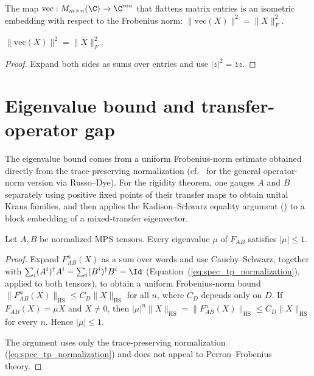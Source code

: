 \begin{definition}\label{def:mat_to_es}
    \leanok
    The map $\mathrm{vec} : M_{m \times n}(\C) \to \C^{mn}$ that
    flattens matrix entries is an isometric embedding with respect
    to the Frobenius norm: $\|\mathrm{vec}(X)\|^2 = \|X\|_F^2$.
\end{definition}

\begin{lemma}\label{lem:norm_mat_to_es}
    \leanok
    $\|\mathrm{vec}(X)\|^2 = \|X\|_F^2$.
\end{lemma}

\begin{proof}\leanok
    Expand both sides as sums over entries and use $|z|^2 = \bar{z}z$.
\end{proof}

\section{Eigenvalue bound and transfer-operator gap}

The eigenvalue bound comes from a uniform Frobenius-norm estimate
obtained directly from the trace-preserving normalization
(cf.~\cite[Proposition~6.1]{Wolf2012Quantum} for the general
operator-norm version via Russo--Dye).
For the rigidity theorem, one gauges $A$ and $B$ separately using
positive fixed points of their transfer maps to obtain unital Kraus
families, and then applies the Kadison--Schwarz equality argument
(\cite[Theorem~5.3]{Wolf2012Quantum}) to
a block embedding of a mixed-transfer eigenvector.

\begin{theorem}\label{thm:eigenvalue_bound}
    \leanok
    Let $A, B$ be normalized MPS tensors.
    Every eigenvalue $\mu$ of $F_{AB}$ satisfies $|\mu| \le 1$.
\end{theorem}

\begin{proof}
    \leanok
    Expand $F_{AB}^n(X)$ as a sum over words and use Cauchy--Schwarz,
    together with
    $\sum_i (A^i)^\dagger A^i = \sum_i (B^i)^\dagger B^i = \Id$
    (Equation~(\ref{eq:spec_tp_normalization}), applied to both tensors),
    to obtain a uniform Frobenius-norm bound
    $\|F_{AB}^n(X)\|_{\mathrm{HS}} \le C_D \|X\|_{\mathrm{HS}}$
    for all $n$, where $C_D$ depends only on $D$.
    If $F_{AB}(X) = \mu X$ and $X \neq 0$, then
    $|\mu|^n \|X\|_{\mathrm{HS}}
        = \|F_{AB}^n(X)\|_{\mathrm{HS}}
        \le C_D \|X\|_{\mathrm{HS}}$
    for every $n$.
    Hence $|\mu| \le 1$.

    The argument uses only the trace-preserving normalization
    (\ref{eq:spec_tp_normalization})
    and does not appeal to Perron--Frobenius theory.
\end{proof}

